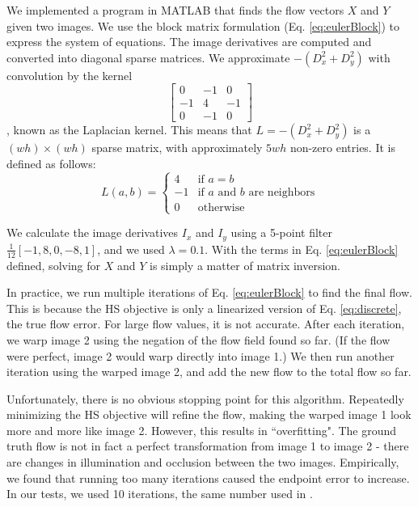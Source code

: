 \documentclass[10pt,twocolumn,letterpaper]{article}
\begin{document}
We implemented a program in MATLAB that finds the flow vectors $X$ and $Y$ given two images.  We use the block matrix formulation (Eq. \ref{eq:eulerBlock}) to express the system of equations.  The image derivatives are computed and converted into diagonal sparse matrices.  We approximate $-(D_x^2 + D_y^2)$ with convolution by the kernel
\begin{equation} \label{eq:laplacian}
\left[ \begin{array}{ccc}
0 & -1 & 0 \\
-1 & 4 & -1 \\
0 & -1 & 0
\end{array} \right]
\end{equation}
, known as the Laplacian kernel.  This means that $L = -(D_x^2 + D_y^2)$ is a $(wh) \times (wh)$ sparse matrix, with approximately $5wh$ non-zero entries.  It is defined as follows:
\begin{equation} \label{eq:laplacian2}
L(a, b) = \begin{cases}
4 & \text{if } a = b \\
-1 & \text{if $a$ and $b$ are neighbors} \\
0 & \text{otherwise}
\end{cases}
\end{equation}

We calculate the image derivatives $I_x$ and $I_y$ using a 5-point filter $\frac{1}{12}[-1, 8, 0, -8, 1]$, and we used $\lambda = 0.1$.  With the terms in Eq. \ref{eq:eulerBlock} defined, solving for $X$ and $Y$ is simply a matter of matrix inversion.

In practice, we run multiple iterations of Eq. \ref{eq:eulerBlock} to find the final flow.  This is because the HS objective is only a linearized version of Eq. \ref{eq:discrete}, the true flow error.  For large flow values, it is not accurate.  After each iteration, we warp image 2 using the negation of the flow field found so far.  (If the flow were perfect, image 2 would warp directly into image 1.)  We then run another iteration using the warped image 2, and add the new flow to the total flow so far.

Unfortunately, there is no obvious stopping point for this algorithm.  Repeatedly minimizing the HS objective will refine the flow, making the warped image 1 look more and more like image 2.  However, this results in ``overfitting".  The ground truth flow is not in fact a perfect transformation from image 1 to image 2 - there are changes in illumination and occlusion between the two images.  Empirically, we found that running too many iterations caused the endpoint error to increase.  In our tests, we used 10 iterations, the same number used in \cite{sun}.
\end{document}
